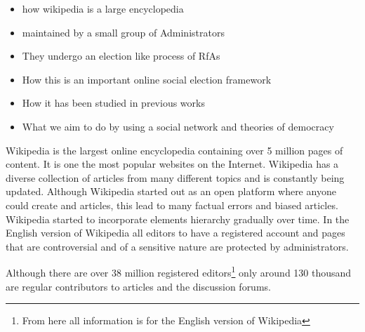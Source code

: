 



\begin{itemize}
    \item how wikipedia is a large encyclopedia
    \item maintained by a small group of Administrators
    \item They undergo an election like process of RfAs
    \item How this is an important online social election framework
    \item How it has been studied in previous works 
    \item What we aim to do by using a social network and theories of democracy
\end{itemize}

Wikipedia is the largest online encyclopedia containing over 5 million pages of content. It is one the most popular websites on the Internet. Wikipedia has a diverse collection of articles from many different topics and is constantly being updated. Although Wikipedia started out as an open platform where anyone could create and articles, this lead to many factual errors and biased articles. Wikipedia started to incorporate elements hierarchy gradually over time. In the English version of Wikipedia all editors to have a registered account and pages that are controversial and of a sensitive nature are protected by administrators.
\smallskip

Although there are over 38 million registered editors\footnote{From here all information is for the English version of Wikipedia} only around 130 thousand are regular contributors to articles and the discussion forums. 


